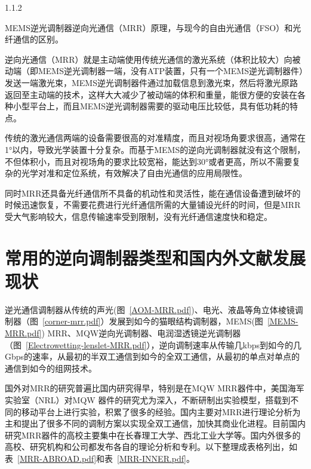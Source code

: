 1.1.2\ {MEMS逆光调制器逆向光通信（MRR）原理，与现今的自由光通信（FSO）和光纤通信的区别。


逆向光通信（MRR）就是主动端使用传统光通信的激光系统（体积比较大）向被动端（即MEMS逆光调制器一端，没有ATP装置，只有一个MEMS逆光调制器件）发送一端激光束，MEMS逆光调制器件通过加载信息到激光束，然后将激光原路返回至主动端的技术，这样大大减少了被动端的体积和重量，能很方便的安装在各种小型平台上，而且MEMS逆光调制器需要的驱动电压比较低，具有低功耗的特点。

传统的激光通信两端的设备需要很高的对准精度，而且对视场角要求很高，通常在1°以内，导致光学装置十分复杂。而基于MEMS的逆向光调制器就没有这个限制，不但体积小，而且对视场角的要求比较宽裕，能达到30°或者更高，所以不需要复杂的光学对准和定位系统，有效解决了自由光通信的应用局限性。

同时MRR还具备光纤通信所不具备的机动性和灵活性，能在通信设备遭到破坏的时候迅速恢复，不需要花费进行光纤通信所需的大量铺设光纤的时间，但是MRR受大气影响较大，信息传输速率受到限制，没有光纤通信速度快和稳定。





\section{常用的逆向调制器类型和国内外文献发展现状}
逆光通信调制器\citep{李展.2007, 孙华燕.2013, 邱灏.2015b}从传统的声光(图~\ref{AOM-MRR.pdf})、电光、液晶等角立体棱镜调制器（图~\ref{corner-mrr.pdf}）发展到如今的猫眼结构\citep{李展., 魏宾.b,任建迎.2017}调制器，MEMS(图~\ref{MEMS-MRR.pdf}) MRR、MQW逆向光调制器、电润湿透镜逆光调制器（图~\ref{Electrowetting-lenslet-MRR.pdf}），逆向调制速率从传输几kbps到如今的几Gbps的速率，从最初的半双工通信到如今的全双工通信，从最初的单点对单点的通信到如今的组网技术。

国外对MRR的研究普遍比国内研究得早，特别是在MQW MRR器件中，美国海军实验室（NRL）对MQW 器件的研究尤为深入，不断研制出实验模型，搭载到不同的移动平台上进行实验，积累了很多的经验。国内主要对MRR进行理论分析为主和提出了很多不同的调制方案以实现全双工通信，加快其商业化进程。目前国内研究MRR器件的高校主要集中在长春理工大学、西北工业大学等。国内外很多的高校、研究机构和公司都发布各自的理论分析和专利。以下整理成表格列出\citep{曾智龙.2017}，如表~\ref{MRR-ABROAD.pdf}和表~\ref{MRR-INNER.pdf}。


}
